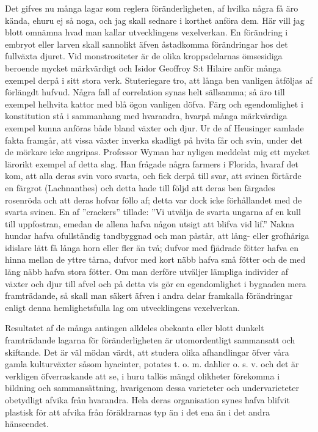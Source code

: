 Det gifves nu många lagar som reglera föränderligheten, af hvilka några få äro kända, ehuru ej så noga, och jag skall sednare i korthet anföra dem. Här vill jag blott omnämna hvad man kallar utvecklingens vexelverkan. En förändring i embryot eller larven skall sannolikt äfven åstadkomma förändringar hos det fullväxta djuret. Vid monstrositeter är de olika kroppsdelarnas ömsesidiga beroende mycket märkvärdigt och Isidor Geoffroy S:t Hilaire anför många exempel derpå i sitt stora verk. Stuteriegare tro, att långa ben vanligen åtföljas af förlängdt hufvud. Några fall af correlation synas helt sällsamma; så äro till exempel helhvita kattor med blå ögon vanligen döfva. Färg och egendomlighet i konstitution stå i sammanhang med hvarandra, hvarpå många märkvärdiga exempel kunna anföras både bland växter och djur. Ur de af Heusinger samlade fakta framgår, att vissa växter inverka skadligt på hvita får och svin, under det de mörkare icke angripas. Professor Wyman har nyligen meddelat mig ett mycket lärorikt exempel af detta slag. Han frågade några farmers i Florida, hvaraf det kom, att alla deras svin voro svarta, och fick derpå till svar, att svinen förtärde en färgrot (Lachnanthes) och detta hade till följd att deras ben färgades rosenröda och att deras hofvar föllo af; detta var dock icke förhållandet med de svarta svinen. En af ”crackers” tillade: ”Vi utvälja de svarta ungarna af en kull till uppfostran, emedan de allena hafva någon utsigt att blifva vid lif.” Nakna hundar hafva ofullständig tandbyggnad och man påstår, att lång- eller grofhåriga idislare lätt få långa horn eller fler än två; dufvor med fjädrade fötter hafva en hinna mellan de yttre tårna, dufvor med kort näbb hafva små fötter och de med lång näbb hafva stora fötter. Om man derföre utväljer lämpliga individer af växter och djur till afvel och på detta vis gör en egendomlighet i bygnaden mera framträdande, så skall man säkert äfven i andra delar framkalla förändringar enligt denna hemlighetsfulla lag om utvecklingens vexelverkan.

Resultatet af de många antingen alldeles obekanta eller blott dunkelt framträdande lagarna för föränderligheten är utomordentligt sammansatt och skiftande. Det är väl mödan värdt, att studera olika afhandlingar öfver våra gamla kulturväxter såsom hyacinter, potates t. o. m. dahlier o. s. v. och det är verkligen öfverraskande att se, i huru tallös mängd olikheter förekomma i bildning och sammansättning, hvarigenom dessa varieteter och undervarieteter obetydligt afvika från hvarandra. Hela deras organisation synes hafva blifvit plastisk för att afvika från föräldrarnas typ än i det ena än i det andra hänseendet.

